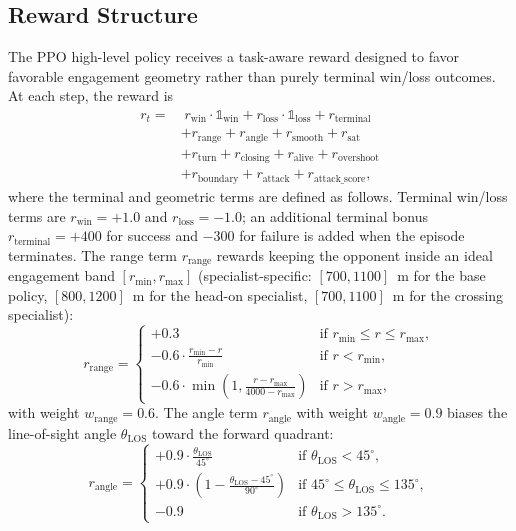 \documentclass[5p,times]{elsarticle} %
\begin{document}
\subsection{Reward Structure}

The PPO high-level policy receives a task-aware reward designed to favor favorable engagement geometry rather than purely terminal win/loss outcomes. At each step, the reward is
\begin{equation}
\begin{aligned}
r_t =&\; r_{\text{win}} \cdot \mathbb{1}_{\text{win}} + r_{\text{loss}} \cdot \mathbb{1}_{\text{loss}} + r_{\text{terminal}} \\
    &+ r_{\text{range}} + r_{\text{angle}} + r_{\text{smooth}} + r_{\text{sat}} \\
    &+ r_{\text{turn}} + r_{\text{closing}} + r_{\text{alive}} + r_{\text{overshoot}} \\
    &+ r_{\text{boundary}} + r_{\text{attack}} + r_{\text{attack\_score}},
\end{aligned}
\end{equation}
where the terminal and geometric terms are defined as follows. Terminal win/loss terms are $r_{\text{win}} = +1.0$ and $r_{\text{loss}} = -1.0$; an additional terminal bonus $r_{\text{terminal}} = +400$ for success and $-300$ for failure is added when the episode terminates. The range term $r_{\text{range}}$ rewards keeping the opponent inside an ideal engagement band $[r_{\min}, r_{\max}]$ (specialist-specific: $[700, 1100]$~m for the base policy, $[800, 1200]$~m for the head-on specialist, $[700, 1100]$~m for the crossing specialist):
\begin{equation}
r_{\text{range}} =
\begin{cases}
+0.3 & \text{if } r_{\min} \le r \le r_{\max}, \\
-0.6 \cdot \frac{r_{\min} - r}{r_{\min}} & \text{if } r < r_{\min}, \\
-0.6 \cdot \min\!\left(1, \frac{r - r_{\max}}{4000 - r_{\max}}\right) & \text{if } r > r_{\max},
\end{cases}
\end{equation}
with weight $w_{\text{range}} = 0.6$. The angle term $r_{\text{angle}}$ with weight $w_{\text{angle}} = 0.9$ biases the line-of-sight angle $\theta_{\text{LOS}}$ toward the forward quadrant:
\begin{equation}
r_{\text{angle}} =
\begin{cases}
+0.9 \cdot \frac{\theta_{\text{LOS}}}{45^{\circ}} & \text{if } \theta_{\text{LOS}} < 45^{\circ}, \\
+0.9 \cdot \left(1 - \frac{\theta_{\text{LOS}} - 45^{\circ}}{90^{\circ}}\right) & \text{if } 45^{\circ} \le \theta_{\text{LOS}} \le 135^{\circ}, \\
-0.9 & \text{if } \theta_{\text{LOS}} > 135^{\circ}.
\end{cases}
\end{equation}
\end{document}
